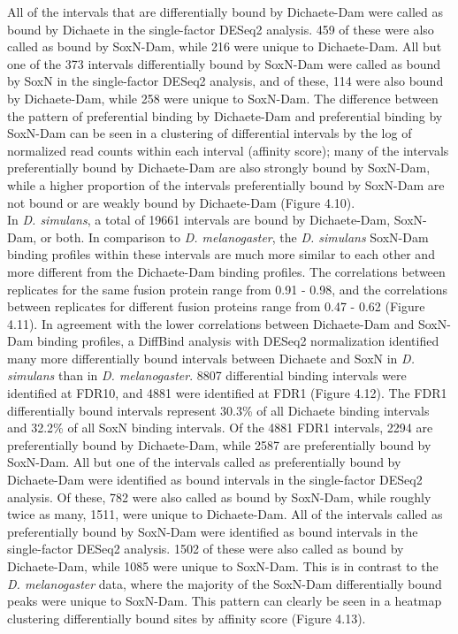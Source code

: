 All of the intervals that are differentially bound by Dichaete-Dam were called as bound by Dichaete in the single-factor DESeq2 analysis. 459 of these were also called as bound by SoxN-Dam, while 216 were unique to Dichaete-Dam. All but one of the 373 intervals differentially bound by SoxN-Dam were called as bound by SoxN in the single-factor DESeq2 analysis, and of these, 114 were also bound by Dichaete-Dam, while 258 were unique to SoxN-Dam. The difference between the pattern of preferential binding by Dichaete-Dam and preferential binding by SoxN-Dam can be seen in a clustering of differential intervals by the log of normalized read counts within each interval (affinity score); many of the intervals preferentially bound by Dichaete-Dam are also strongly bound by SoxN-Dam, while a higher proportion of the intervals preferentially bound by SoxN-Dam are not bound or are weakly bound by Dichaete-Dam (Figure 4.10).\\

In \emph{D. simulans}, a total of 19661 intervals are bound by Dichaete-Dam, SoxN-Dam, or both. In comparison to \emph{D. melanogaster}, the \emph{D. simulans} SoxN-Dam binding profiles within these intervals are much more similar to each other and more different from the Dichaete-Dam binding profiles. The correlations between replicates for the same fusion protein range from 0.91 - 0.98, and the correlations between replicates for different fusion proteins range from 0.47 - 0.62 (Figure 4.11). In agreement with the lower correlations between Dichaete-Dam and SoxN-Dam binding profiles, a DiffBind analysis with DESeq2 normalization identified many more differentially bound intervals between Dichaete and SoxN in \emph{D. simulans} than in \emph{D. melanogaster}. 8807 differential binding intervals were identified at FDR10, and 4881 were identified at FDR1 (Figure 4.12). The FDR1 differentially bound intervals represent 30.3\% of all Dichaete binding intervals and 32.2\% of all SoxN binding intervals. Of the 4881 FDR1 intervals, 2294 are preferentially bound by Dichaete-Dam, while 2587 are preferentially bound by SoxN-Dam. All but one of the intervals called as preferentially bound by Dichaete-Dam were identified as bound intervals in the single-factor DESeq2 analysis. Of these, 782 were also called as bound by SoxN-Dam, while roughly twice as many, 1511, were unique to Dichaete-Dam. All of the intervals called as preferentially bound by SoxN-Dam were identified as bound intervals in the single-factor DESeq2 analysis. 1502 of these were also called as bound by Dichaete-Dam, while 1085 were unique to SoxN-Dam. This is in contrast to the \emph{D. melanogaster} data, where the majority of the SoxN-Dam differentially bound peaks were unique to SoxN-Dam. This pattern can clearly be seen in a heatmap clustering differentially bound sites by affinity score (Figure 4.13).\\

